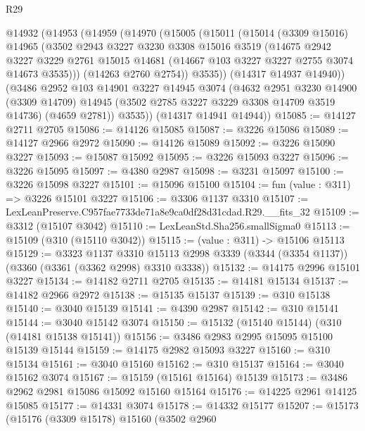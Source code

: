 \begin{lexlean}{R29}
\begin{coremodule}
  @14932
    (@14953
      (@14959
        (@14970
          (@15005
            (@15011
              (@15014
                (@3309 @15016)
                @14965
                (@3502
                  @2943
                  @3227
                  @3230
                  @3308
                  @15016
                  @3519
                  (@14675
                    @2942
                    @3227
                    @3229
                    @2761
                    @15015
                    @14681
                    (@14667 @103 @3227 @3227 @2755 @3074 @14673 @3535)))
                (@14263 @2760 @2754))
              @3535))
          (@14317 @14937 @14940))
        (@3486
          @2952
          @103
          @14901
          @3227
          @14945
          @3074
          (@4632
            @2951
            @3230
            @14900
            (@3309 @14709)
            @14945
            (@3502 @2785 @3227 @3229 @3308 @14709 @3519 @14736)
            (@4659 @2781))
          @3535))
      (@14317 @14941 @14944))
@15085 := @14127 @2711 @2705
@15086 := @14126 @15085
@15087 := @3226 @15086
@15089 := @14127 @2966 @2972
@15090 := @14126 @15089
@15092 := @3226 @15090 @3227
@15093 := @15087 @15092
@15095 := @3226 @15093 @3227
@15096 := @3226 @15095
@15097 := @4380 @2987
@15098 := @3231 @15097
@15100 := @3226 @15098 @3227
@15101 := @15096 @15100
@15104 := fun (value : @311) => @3226 @15101 @3227
@15106 := @3306 @1137 @3310
@15107 := LexLeanPreserve.C957fae7733de71a8e9ca0df28d31cdad.R29.__fits_32
@15109 := @3312 (@15107 @3042)
@15110 := LexLeanStd.Sha256.smallSigma0
@15113 := @15109 (@310 (@15110 @3042))
@15115 := (value : @311) -> @15106 @15113
@15129 := @3323
    @1137
    @3310
    @15113
    @2998
    @3339
    (@3344 (@3354 @1137))
    (@3360 (@3361 (@3362 @2998) @3310 @3338))
@15132 := @14175 @2996 @15101 @3227
@15134 := @14182 @2711 @2705
@15135 := @14181 @15134
@15137 := @14182 @2966 @2972
@15138 := @15135 @15137
@15139 := @310 @15138
@15140 := @3040 @15139
@15141 := @4390 @2987
@15142 := @310 @15141
@15144 := @3040 @15142 @3074
@15150 := @15132 (@15140 @15144) (@310 (@14181 @15138 @15141))
@15156 := @3486 @2983 @2995 @15095 @15100 @15139 @15144
@15159 := @14175 @2982 @15093 @3227
@15160 := @310 @15134
@15161 := @3040 @15160
@15162 := @310 @15137
@15164 := @3040 @15162 @3074
@15167 := @15159 (@15161 @15164) @15139
@15173 := @3486 @2962 @2981 @15086 @15092 @15160 @15164
@15176 := @14225 @2961 @14125 @15085
@15177 := @14331 @3074
@15178 := @14332 @15177
@15207 := @15173
    (@15176
      (@3309 @15178)
      @15160
      (@3502
        @2960

\end{coremodule}
\end{lexlean}
